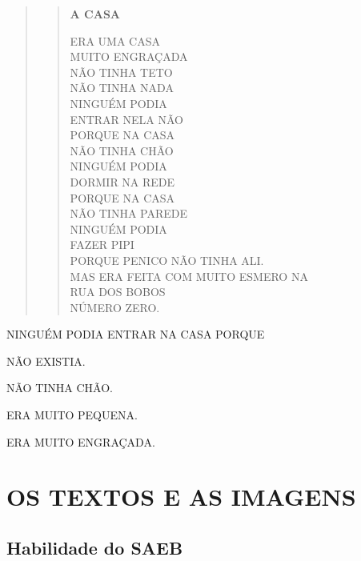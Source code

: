 \begin{quote}
\begin{verse}
\textbf{A CASA}

ERA UMA CASA\\
MUITO ENGRAÇADA\\
NÃO TINHA TETO\\
NÃO TINHA NADA\\
NINGUÉM PODIA\\
ENTRAR NELA NÃO\\
PORQUE NA CASA\\
NÃO TINHA CHÃO\\
NINGUÉM PODIA\\
DORMIR NA REDE\\
PORQUE NA CASA\\
NÃO TINHA PAREDE\\
NINGUÉM PODIA\\
FAZER PIPI\\
PORQUE PENICO NÃO TINHA ALI.\\
MAS ERA FEITA COM MUITO ESMERO NA\\
RUA DOS BOBOS\\
NÚMERO ZERO.
\end{verse}

\end{quote}

NINGUÉM PODIA ENTRAR NA CASA PORQUE

\begin{escolha}
\item NÃO EXISTIA.

\item NÃO TINHA CHÃO.

\item ERA MUITO PEQUENA.

\item ERA MUITO ENGRAÇADA.
\end{escolha}

\chapter{OS TEXTOS E AS IMAGENS}

\vspace*{-1cm}

\section{Habilidade do SAEB}

